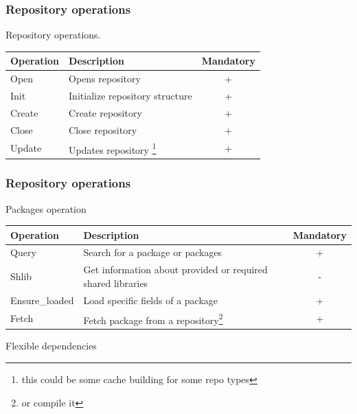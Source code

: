 \documentclass{beamer}
\begin{document}
\begin{frame}
\frametitle{Repository operations}
Repository operations.
\begin{table}[h]
\begin{tabular}{|l|p{6cm}|c|}
\hline
\textbf{Operation} & \textbf{Description} & \textbf{Mandatory} \\
\hline
\hline
Open & Opens repository & + \\
\hline
Init & Initialize repository structure & + \\
\hline
Create & Create repository & + \\
\hline
Close & Close repository & + \\
\hline
Update & Updates repository \footnote{this could be some cache building for some
repo types} & + \\
\hline
\end{tabular}
\end{table}
\end{frame}

\begin{frame}
\frametitle{Repository operations}
Packages operation
\begin{table}[h]
\begin{tabular}{|l|p{6cm}|c|}
\hline
\textbf{Operation} & \textbf{Description} & \textbf{Mandatory} \\
\hline
\hline
Query & Search for a package or packages & + \\
\hline
Shlib & Get information about provided or required shared libraries & - \\
\hline
Ensure\_loaded & Load specific fields of a package & + \\
\hline
Fetch & Fetch package from a repository\footnote{or compile it} & + \\
\hline
\end{tabular}
\end{table}
\end{frame}

\begin{frame}
\begin{center}
\huge{Flexible dependencies}
\end{center}
\end{frame}
\end{document}
